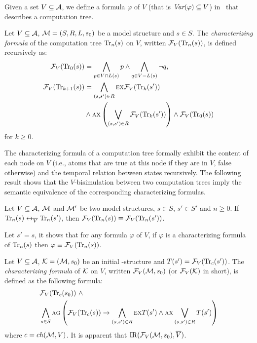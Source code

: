 \documentclass{article}
\begin{document}
Given a set $V\subseteq{\cal A}$, we define a formula $\varphi$ of $V$ (that is $\textit{Var}(\varphi) \subseteq V$) in \CTL\ that describes a computation tree.
\begin{definition}\label{def:V:char:formula}
Let $V\subseteq {\cal A}$, ${\cal M} =(S,R,L,s_0)$ be a model structure and $s\in S$.
The {\em characterizing formula} of the computation tree $\textrm{Tr}_n(s)$ on $V$,
written ${\cal F}_V(\textrm{Tr}_n(s))$, is defined recursively as:
\begin{align*}
   {\cal F}_V(\textrm{Tr}_0(s)) &=  \bigwedge_{p \in V\cap L(s)}p
     \wedge \bigwedge_{q\in V-L(s)} \neg q,\\
   {\cal F}_V(\textrm{Tr}_{k+1}(s))& = \bigwedge_{(s,s')\in R}
    \textsc{e} \textsc{x} {\cal F}_V(\textrm{Tr}_k(s'))\\
  &\wedge
    \textsc{a} \textsc{x} \left( \bigvee_{(s,s')\in R} {\cal F}_V(\textrm{Tr}_k(s')) \right) \wedge {\cal F}_V(\textrm{Tr}_0(s))
\end{align*}
for $k\ge 0$.
\end{definition}
The characterizing formula of a computation tree formally exhibit the content of each node on $V$ (i.e., atoms that are  true at this node if they are in $V$,  false otherwise) and the temporal relation between states recursively.  The following result shows that the $V$-bisimulation between two computation trees imply the semantic equivalence of the corresponding characterizing formulas.

\begin{lemma}\label{lem:Vb:TrFormula:Equ}
Let $V\subseteq {\cal A}$, ${\cal M}$ and ${\cal M}'$ be two model structures,
$s\in S$, $s'\in S'$ and $n\ge 0$. If $\textrm{Tr}_n(s) \leftrightarrow_{\overline V} \textrm{Tr}_n(s')$, then ${\cal F}_V(\textrm{Tr}_n(s)) \equiv {\cal F}_V(\textrm{Tr}_n(s'))$.
\end{lemma}
Let $s'=s$, it shows that for any formula $\varphi$ of $V$, if $\varphi$ is a characterizing formula of $\textrm{Tr}_n(s)$ then $\varphi \equiv {\cal F}_V(\textrm{Tr}_n(s))$.



Let $V\subseteq\cal A$,
 ${\cal K}=({\cal M},s_0)$ be an initial \MPK-structure and $T(s') = {\cal F}_V(\textrm{Tr}_c(s'))$.
The {\em characterizing formula} of $\cal K$ on $V$, written ${\cal F}_V({\cal M},s_0)$ (or ${\cal F}_V({\cal K})$ in short), is
defined as the following formula:
\begin{align*}
  &{\cal F}_V(\textrm{Tr}_c(s_0)) \text{ } \wedge \\
  & \bigwedge_{s\in S}\textsc{a} \textsc{g}\left(
    {\cal F}_V(\textrm{Tr}_c(s)) \rightarrow
    \bigwedge_{(s,s')\in R}
        \textsc{e} \textsc{x} T(s')
        \wedge
        \textsc{a} \textsc{x} \bigvee_{(s,s')\in R}T(s')
    \right)
\end{align*}
where $c=ch({\cal M},V)$. It is apparent that $\textrm{IR}({\cal F}_V({\cal M}, s_0), \overline V)$.
\end{document}
